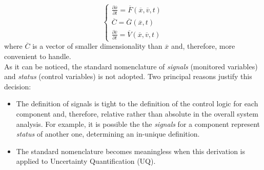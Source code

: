 \begin{equation}
\label{eq:controlVars}
\left\{\begin{matrix}
\frac{\partial \overline{x} }{\partial t} = \overline{F}\left (  \overline{x}, \overline{v}, t \right )  \\ 
 \overline{C} =  \overline{G}(\overline{x},t)     \\
\frac{\partial \overline{v} }{\partial t} = \overline{V}\left (  \overline{x}, \overline{v}, t \right )
\end{matrix}\right.
\end{equation}
where $\overline{C}$ is a vector of smaller dimensionality than $\overline{x}$ and,
therefore, more convenient to handle.
\\As it can be noticed, the standard nomenclature of \textit{signals} (monitored variables) and \textit{status} (control variables) is not adopted. Two principal reasons 
justify this decision:
\begin{itemize}
  \item The definition of signals is tight to the definition of the 
  control logic for each component and, therefore, relative rather than absolute in the 
  overall system analysis. For example, it is possible the the \textit{signals} for a 
  component represent \textit{status} of another one, determining an in-unique 
  definition.
  \item The standard nomenclature becomes meaningless when this derivation is 
  applied to Uncertainty Quantification (UQ).
\end{itemize}

